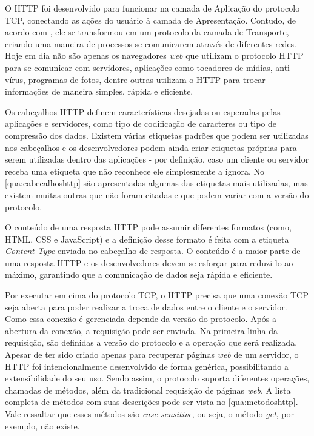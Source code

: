 O HTTP foi desenvolvido para funcionar na camada de Aplicação do protocolo TCP, conectando as ações do usuário à camada de Apresentação. Contudo, de acordo com , ele se transformou em um protocolo da camada de Transporte, criando uma maneira de processos se comunicarem através de diferentes redes. Hoje em dia não são apenas os navegadores \textit{web} que utilizam o protocolo HTTP para se comunicar com servidores, aplicações como tocadores de mídias, anti-vírus, programas de fotos, dentre outras utilizam o HTTP para trocar informações de maneira simples, rápida e eficiente.

Os cabeçalhos HTTP definem características desejadas ou esperadas pelas aplicações e servidores, como tipo de codificação de caracteres ou tipo de compressão dos dados. Existem várias etiquetas padrões que podem ser utilizadas nos cabeçalhos e os desenvolvedores podem ainda criar etiquetas próprias para serem utilizadas dentro das aplicações - por definição, caso um cliente ou servidor receba uma etiqueta que não reconhece ele simplesmente a ignora. No \autoref{qua:cabecalhoshttp} são apresentadas algumas das etiquetas mais utilizadas, mas existem muitas outras que não foram citadas e que podem variar com a versão do protocolo.



O conteúdo de uma resposta HTTP pode assumir diferentes formatos (como, HTML, CSS e JavaScript) e a definição desse formato é feita com a etiqueta \textit{Content-Type} enviada no cabeçalho de resposta. O conteúdo é a maior parte de uma resposta HTTP e os desenvolvedores devem se esforçar para reduzi-lo ao máximo, garantindo que a comunicação de dados seja rápida e eficiente.

Por executar em cima do protocolo TCP, o HTTP precisa que uma conexão TCP seja aberta para poder realizar a troca de dados entre o cliente e o servidor. Como essa conexão é gerenciada depende da versão do protocolo. Após a abertura da conexão, a requisição pode ser enviada. Na primeira linha da requisição, são definidas a versão do protocolo e a operação que será realizada. Apesar de ter sido criado apenas para recuperar páginas \textit{web} de um servidor, o HTTP foi intencionalmente desenvolvido de forma genérica, possibilitando a extensibilidade do seu uso. Sendo assim, o protocolo suporta diferentes operações, chamadas de métodos, além da tradicional requisição de páginas \textit{web}. A lista completa de métodos com suas descrições pode ser vista no \autoref{qua:metodoshttp}. Vale ressaltar que esses métodos são \textit{case sensitive}, ou seja, o método \textit{get}, por exemplo, não existe.

